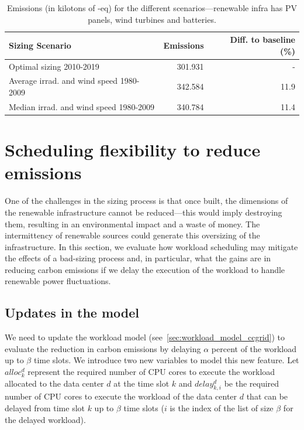        
\begin{table}[H]
  \caption{Emissions (in kilotons of -eq) for the different scenarios---renewable infra has PV panels, wind turbines and batteries.} \centering
    \label{tab:co2_10y}
      \begin{tabular}{|l|r|r|}        
        \hline        
        \textbf{Sizing Scenario} &  \textbf{Emissions } & \textbf{Diff. to baseline (\%) } \\
        \hline        
        Optimal sizing 2010-2019  &       301.931 & - \\
        \hline     
        Average irrad. and wind speed  1980-2009  &      342.584 &  11.9 \\
        \hline
        Median irrad. and wind speed  1980-2009  &      340.784 &   11.4 \\
        \hline        
      \end{tabular}      
    \end{table}


    
\section{Scheduling flexibility to reduce  emissions}

One of the challenges in the sizing process is that once built, the dimensions of the renewable infrastructure cannot be reduced---this would imply destroying them, resulting in an environmental impact and a waste of money. The intermittency of renewable sources could generate this oversizing of the infrastructure. In this section, we evaluate how workload scheduling may mitigate the effects of a bad-sizing process and, in particular, what the gains are in reducing carbon emissions if we delay the execution of the workload to handle renewable power fluctuations.

\label{sec:flexibility}

\subsection{Updates in the model}

We need to update the workload model (see~\ref{sec:workload_model_ccgrid}) to evaluate the reduction in carbon emissions by delaying $\alpha$ percent of the workload up to $\beta$ time slots. We introduce two new variables to model this new feature. Let $alloc^d_k$ represent the required number of CPU cores to execute the workload allocated to the data center $d$ at the time slot $k$ and $delay_{k,i}^d$ be the required number of CPU cores to execute the workload of the data center $d$ that can be delayed from time slot $k$ up to $\beta$ time slots ($i$ is the index of the list of size $\beta$ for the delayed workload). 

